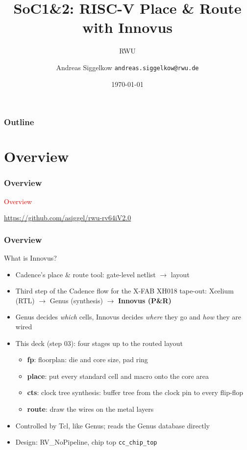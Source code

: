 \documentclass{beamer}
\title{SoC1\&2: RISC-V Place \& Route with Innovus}
\author[AS]{Andreas Siggelkow \newline \texttt{andreas.siggelkow@rwu.de}}
\date[2026]{\today}
\subtitle{RWU}
\institute{Elektrotechnik und Informatik}
\newcommand{\astitle}{nix}
\newcommand{\assubtitle}{nix}
\newcommand{\cmd}[1]{\texttt{#1}}
\begin{document}
\setcounter{tocdepth}{1}

\begin{frame}
  \titlepage
\end{frame}

\begin{frame}
  \frametitle{Outline}
  \tableofcontents
\end{frame}

\section{Overview}
\renewcommand{\astitle}{Overview}
\begin{frame}
\frametitle{\astitle}
\textcolor{red}{Overview}

\url{https://github.com/asiggel/rwu-rv64iV2.0}
\end{frame}

\renewcommand{\assubtitle}{What is Innovus?}
\begin{frame}
\frametitle{\astitle}
\begin{block}{\assubtitle}
  \footnotesize
  \begin{itemize}
    \item Cadence's place \& route tool: gate-level netlist $\rightarrow$ layout
    \item Third step of the Cadence flow for the X-FAB XH018 tape-out:
      Xcelium (RTL) $\rightarrow$ Genus (synthesis) $\rightarrow$ \textbf{Innovus (P\&R)}
    \item Genus decides \emph{which} cells, Innovus decides \emph{where} they
      go and \emph{how} they are wired
    \item This deck (step 03): four stages up to the routed layout
    \begin{itemize}
      \item \textbf{fp}: floorplan: die and core size, pad ring
      \item \textbf{place}: put every standard cell and macro onto the core area
      \item \textbf{cts}: clock tree synthesis: buffer tree from the clock pin
        to every flip-flop
      \item \textbf{route}: draw the wires on the metal layers
    \end{itemize}
    \item Controlled by Tcl, like Genus; reads the Genus database directly
    \item Design: RV\_NoPipeline, chip top \cmd{cc\_chip\_top}
  \end{itemize}
\end{block}
\end{frame}
\end{document}
